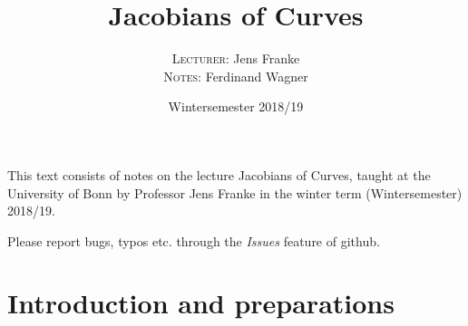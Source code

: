 \documentclass[a4paper,parskip=half,numbers=enddot, DIV=12]{scrreprt}
\title{Jacobians of Curves}
\author{\textsc{Lecturer:} Jens Franke\\
	\textsc{Notes:} Ferdinand Wagner}
\date{Wintersemester 2018/19}
\begin{document}
\maketitle
{}

\thispagestyle{plain}
This text consists of notes on the lecture Jacobians of Curves, taught at the University of Bonn by Professor Jens Franke in the winter term (Wintersemester) 2018/19.

Please report bugs, typos etc. through the \emph{Issues} feature of github.

\tableofcontents


\chapter{Introduction and preparations}
\end{document}
